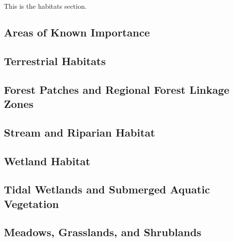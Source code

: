 This is the habitats section.

\subsection{Areas of Known Importance}
\subsection{Terrestrial Habitats}
\subsection{Forest Patches and Regional Forest Linkage Zones}
\subsection{Stream and Riparian Habitat}
\subsection{Wetland Habitat}
\subsection{Tidal Wetlands and Submerged Aquatic Vegetation}
\subsection{Meadows, Grasslands, and Shrublands}

